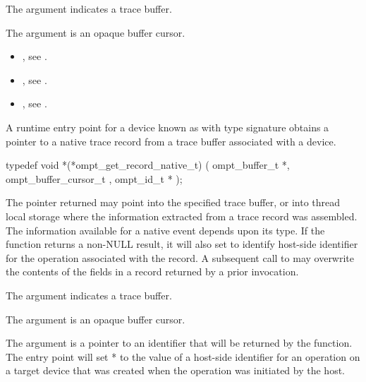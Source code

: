 \argdesc
The argument  indicates a trace buffer.

The argument  is an opaque buffer cursor.

\crossreferences
\begin{itemize}
\item {},
see .
\item {},
see .
\item {},
see .
\end{itemize}

\label{sec:ompt_get_record_native_t}

\summary

A runtime entry point for a device known as
 with type signature
obtains a pointer to a native trace record from a trace buffer associated with a device.

\format
\begin{ccppspecific}
\begin{omptInquiry}
typedef void *(*ompt_get_record_native_t) (
  ompt_buffer_t *,
  ompt_buffer_cursor_t ,
  ompt_id_t *
);
\end{omptInquiry}
\end{ccppspecific}

\descr

The pointer returned  may point into the specified trace buffer, or into
thread local storage where the information extracted from a trace
record was assembled. The information available for a native event
depends upon its type. If the function returns a non-NULL result,
it will also set  to identify host-side identifier
for the operation associated with the record.  A subsequent call
to  may overwrite the
contents of the fields in a record returned by a prior invocation.

\argdesc
The argument  indicates a trace buffer.

The argument  is an opaque buffer cursor.

The argument  is a pointer to an identifier
that will be returned by the function. The entry point will set
* to the value of a host-side identifier for an operation on
a target device that was created when the operation was initiated by
the host.


